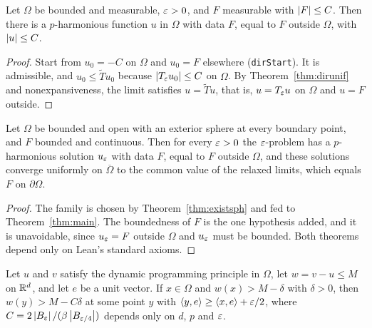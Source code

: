 \begin{theorem}\label{thm:existsph}
\leanok
{}
Let $\Omega$ be bounded and measurable, $\varepsilon > 0$, and $F$ measurable with
$\left\lvert F\right\rvert \le C$. Then there is a $p$-harmonious function $u$ in $\Omega$ with
data $F$, equal to $F$ outside $\Omega$, with $\left\lvert u\right\rvert \le C$.
\end{theorem}

\begin{proof}
\leanok
{}
Start from $u_0 = -C$ on $\Omega$ and $u_0 = F$ elsewhere (\texttt{dirStart}).
It is admissible, and $u_0 \le \widetilde T u_0$ because
$\left\lvert T_\varepsilon u_0\right\rvert \le C$ on $\Omega$. By Theorem~\ref{thm:dirunif} and
nonexpansiveness, the limit satisfies $u = \widetilde T u$, that is,
$u = T_\varepsilon u$ on $\Omega$ and $u = F$ outside.
\end{proof}


\begin{theorem}\label{thm:existsconv}
\leanok
Let $\Omega$ be bounded and open with an exterior sphere at every boundary
point, and $F$ bounded and continuous. Then for every $\varepsilon > 0$ the
$\varepsilon$-problem has a $p$-harmonious solution $u_\varepsilon$ with data $F$, equal to
$F$ outside $\Omega$, and these solutions converge uniformly on
$\overline\Omega$ to the common value of the relaxed limits, which equals $F$
on $\partial\Omega$.
\end{theorem}

\begin{proof}
\leanok
{}
The family is chosen by Theorem~\ref{thm:existsph} and fed to
Theorem~\ref{thm:main}. The boundedness of $F$ is the one hypothesis added, and
it is unavoidable, since $u_\varepsilon = F$ outside $\Omega$ and $u_\varepsilon$ must be
bounded. Both theorems depend only on Lean's standard axioms.
\end{proof}

\begin{lemma}\label{lem:discstep}
\leanok
{}
Let $u$ and $v$ satisfy the dynamic programming principle in $\Omega$, let
$w = v - u \le M$ on $\mathbb{R}^d$, and let $e$ be a unit vector. If $x \in \Omega$ and
$w(x) > M - \delta$ with $\delta > 0$, then $w(y) > M - C\delta$ at some point
$y$ with $\langle y, e\rangle \ge \langle x, e\rangle + \varepsilon/2$, where
$C = 2\left\lvert B_\varepsilon\right\rvert/(\beta\left\lvert B_{\varepsilon/4}\right\rvert)$ depends only on $d$, $p$ and $\varepsilon$.
\end{lemma}

